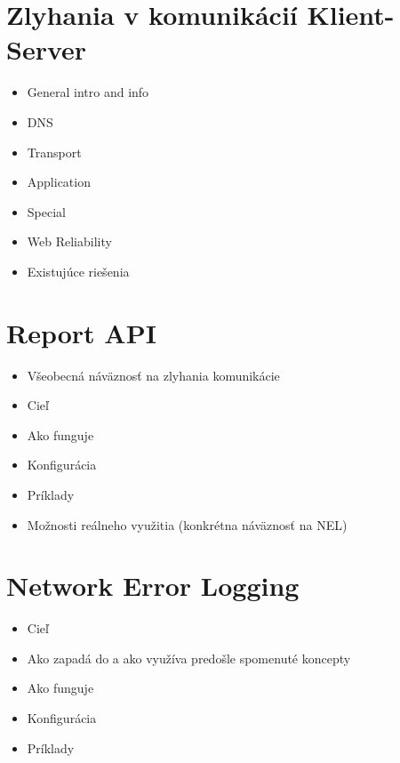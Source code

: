 \section{Zlyhania v komunikácií Klient-Server}
\begin{itemize}
    \item General intro and info
    \item DNS
    \item Transport
    \item Application
    \item Special
    \item Web Reliability
    \item Existujúce riešenia
\end{itemize}

\section{Report API}
\begin{itemize}
    \item Všeobecná náväznosť na zlyhania komunikácie
    \item Cieľ
    \item Ako funguje
    \item Konfigurácia
    \item Príklady
    \item Možnosti reálneho využitia (konkrétna náväznosť na NEL)
\end{itemize}

\section{Network Error Logging}
\begin{itemize}
    \item Cieľ
    \item Ako zapadá do a ako využíva predošle spomenuté koncepty
    \item Ako funguje
    \item Konfigurácia
    \item Príklady
\end{itemize}


